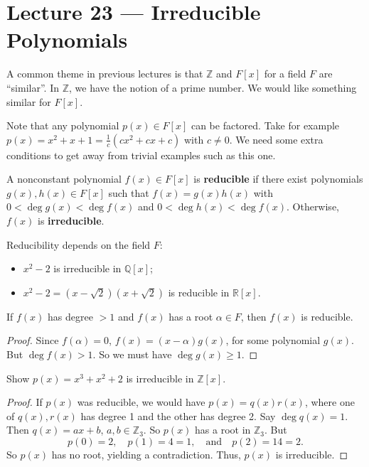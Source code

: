 \section{Lecture 23 — Irreducible Polynomials}

A common theme in previous lectures is that $\mathbb Z$ and $F[x]$ for a field $F$ are ``similar''. In $\mathbb Z$, we have the notion of a prime number. We would like something similar for $F[x]$.

Note that any polynomial $p(x)\in F[x]$ can be factored. Take for example $p(x)=x^2+x+1=\frac1 c(cx^2+cx+c)$ with $c\neq 0$. We need some extra conditions to get away from trivial examples such as this one.

\begin{definition}
	A nonconstant polynomial $f(x)\in F[x]$ is \textbf{reducible} if there exist polynomials $g(x),h(x)\in F[x]$ such that $f(x)=g(x)h(x)$ with $0<\deg g(x)<\deg f(x)$ and $0<\deg h(x)<\deg f(x)$. Otherwise, $f(x)$ is \textbf{irreducible}.
\end{definition}

\begin{remark}
	Reducibility depends on the field $F$:
	\begin{itemize}
		\item $x^2-2$ is irreducible in $\mathbb Q[x]$;
		\item $x^2-2=\left(x-\sqrt 2\right)\left(x+\sqrt 2\right)$ is reducible in $\mathbb R[x]$.
	\end{itemize}
\end{remark}

\begin{proposition}
	If $f(x)$ has degree $>1$ and $f(x)$ has a root $\alpha\in F$, then $f(x)$ is reducible.
\end{proposition}

\begin{proof}
	Since $f(\alpha)=0$, $f(x)=(x-\alpha)g(x)$, for some polynomial $g(x)$. But $\deg f(x)>1$. So we must have $\deg g(x)\geq 1$.
\end{proof}

\begin{example}
	Show $p(x)=x^3+x^2+2$ is irreducible in $\mathbb Z[x]$.
	\begin{proof}
		If $p(x)$ was reducible, we would have $p(x)=q(x)r(x)$, where one of $q(x),r(x)$ has degree 1 and the other has degree 2. Say $\deg q(x)=1$. Then $q(x)=ax+b$, $a,b\in\mathbb Z_3$. So $p(x)$ has a root in $\mathbb Z_{3}$. But
		$$p(0)=2,\quad p(1)=4=1,\quad\text{and}\quad p(2)=14=2.$$
		So $p(x)$ has no root, yielding a contradiction. Thus, $p(x)$ is irreducible.
	\end{proof}
\end{example}

